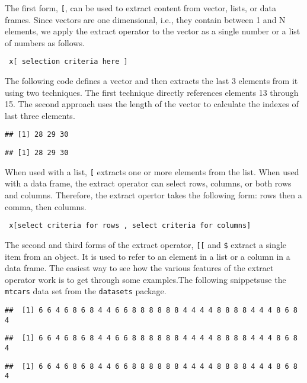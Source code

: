 \documentclass[
]{article}
\begin{document}
The first form, \texttt{{[}}, can be used to extract content from
vector, lists, or data frames. Since vectors are one dimensional, i.e.,
they contain between 1 and N elements, we apply the extract operator to
the vector as a single number or a list of numbers as follows.

\begin{verbatim}
 x[ selection criteria here ]
\end{verbatim}

The following code defines a vector and then extracts the last 3
elements from it using two techniques. The first technique directly
references elements 13 through 15. The second approach uses the length
of the vector to calculate the indexes of last three elements.

\begin{verbatim}
## [1] 28 29 30
\end{verbatim}

\begin{verbatim}
## [1] 28 29 30
\end{verbatim}

When used with a list, \texttt{{[}} extracts one or more elements from
the list. When used with a data frame, the extract operator can select
rows, columns, or both rows and columns. Therefore, the extract opertor
takes the following form: rows then a comma, then columns.

\begin{verbatim}
 x[select criteria for rows , select criteria for columns]
\end{verbatim}

The second and third forms of the extract operator, \texttt{{[}{[}} and
\texttt{\$} extract a single item from an object. It is used to refer to
an element in a list or a column in a data frame. The easiest way to see
how the various features of the extract operator work is to get through
some examples.The following snippetsuse the \texttt{mtcars} data set
from the \texttt{datasets} package.

\begin{verbatim}
##  [1] 6 6 4 6 8 6 8 4 4 6 6 8 8 8 8 8 8 4 4 4 4 8 8 8 8 4 4 4 8 6 8 4
\end{verbatim}

\begin{verbatim}
##  [1] 6 6 4 6 8 6 8 4 4 6 6 8 8 8 8 8 8 4 4 4 4 8 8 8 8 4 4 4 8 6 8 4
\end{verbatim}

\begin{verbatim}
##  [1] 6 6 4 6 8 6 8 4 4 6 6 8 8 8 8 8 8 4 4 4 4 8 8 8 8 4 4 4 8 6 8 4
\end{verbatim}
\end{document}
